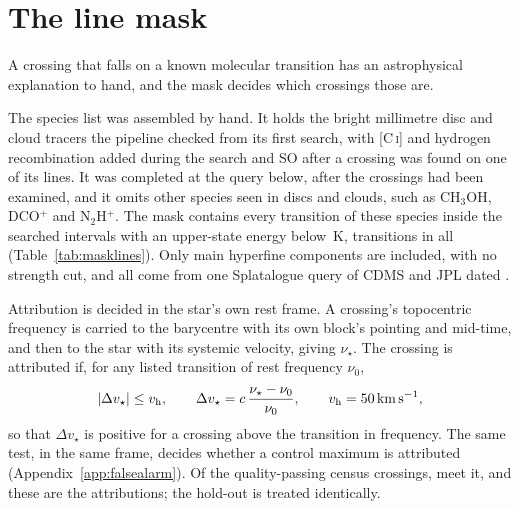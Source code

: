 \section{The line mask}
\label{app:linemask}

A crossing that falls on a known molecular transition has an astrophysical
explanation to hand, and the mask decides which crossings those are.

The species list was assembled by hand. It holds the bright
millimetre disc and cloud tracers the pipeline checked from its first search,
with [C\,\textsc{i}] and hydrogen recombination added during the search and SO
after a crossing was found on one of its lines. It was completed at the query
below, after the crossings had been examined, and it omits other species seen
in discs and clouds, such as CH$_3$OH, DCO$^{+}$ and N$_2$H$^{+}$. The mask
contains every transition of these \FrNSpec{} species inside the
\McNIsland{} searched intervals with an upper-state energy below
\McEuMax\,K, \FrNTrans{} transitions in all (Table~\ref{tab:masklines}).
Only main hyperfine components are included, with no strength cut, and all
come from one Splatalogue query \citep{Splatalogue2007} of CDMS and JPL
\citep{Pickett1998,CDMS2005} dated \MkListDate.

Attribution is decided in the star's own rest frame. A crossing's
topocentric frequency is carried to the barycentre with its own block's
pointing and mid-time, and then to the star with its systemic velocity,
giving $\nu_\star$. The crossing is attributed if, for any listed transition
of rest frequency $\nu_0$,
\begin{equation*}
|\Delta v_\star|\le v_{\rm h},\qquad
\Delta v_\star=c\,\frac{\nu_\star-\nu_0}{\nu_0},\qquad
v_{\rm h}=\MaskHalfKms\,{\rm km\,s^{-1}},
\end{equation*}
so that $\Delta v_\star$ is positive for a crossing above the transition in
frequency. The same test, in the same frame, decides whether a control
maximum is attributed (Appendix~\ref{app:falsealarm}). Of the
\CsNCrossQp{} quality-passing census crossings, \MkNCoinc{} meet it, and these
are the \MkAttr{} attributions; the hold-out is treated identically.

